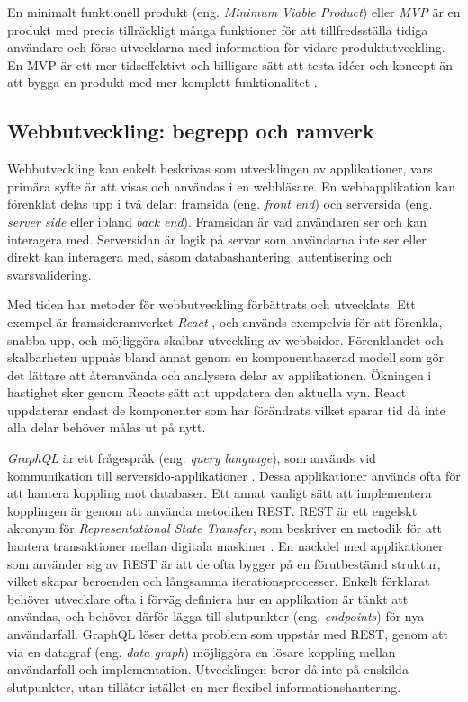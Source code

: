 En minimalt funktionell produkt (eng. \emph{Minimum Viable Product}) eller \emph{MVP} är en produkt med precis tillräckligt många funktioner för att tillfredsställa tidiga användare och förse utvecklarna med information för vidare produktutveckling. En MVP är ett mer tidseffektivt och billigare sätt att testa idéer och koncept än att bygga en produkt med mer komplett funktionalitet \cite{ries}. 

\subsection{Webbutveckling: begrepp och ramverk}
Webbutveckling kan enkelt beskrivas som utvecklingen av applikationer, vars primära syfte är att visas och användas i en webbläsare. En webbapplikation kan förenklat delas upp i två delar: framsida (eng. \emph{front end}) och serversida (eng. \emph{server side} eller ibland \emph{back end}). Framsidan är vad användaren ser och kan interagera med. Serversidan är logik på servar som användarna inte ser eller direkt kan interagera med, såsom databashantering, autentisering och svarsvalidering.

Med tiden har metoder för webbutveckling förbättrats och utvecklats. Ett exempel är framsideramverket \emph{React} \cite{react}, och används exempelvis för att förenkla, snabba upp, och möjliggöra skalbar utveckling av webbsidor. Förenklandet och skalbarheten uppnås bland annat genom en komponentbaserad modell som gör det lättare att återanvända och analysera delar av applikationen. Ökningen i hastighet sker genom Reacts sätt att uppdatera den aktuella vyn. React uppdaterar endast de komponenter som har förändrats vilket sparar tid då inte alla delar behöver målas ut på nytt.

\emph{GraphQL} är ett frågespråk (eng. \emph{query language}), som används vid kommunikation till serversido-applikationer \cite{graphql}. Dessa applikationer används ofta för att hantera koppling mot databaser. Ett annat vanligt sätt att implementera kopplingen är genom att använda metodiken REST. REST är ett engelskt akronym för \emph{Representational State Transfer}, som beskriver en metodik för att hantera transaktioner mellan digitala maskiner \cite{rest}. En nackdel med applikationer som använder sig av REST är att de ofta bygger på en förutbestämd struktur, vilket skapar beroenden och långsamma iterationsprocesser. Enkelt förklarat behöver utvecklare ofta i förväg definiera hur en applikation är tänkt att användas, och behöver därför lägga till slutpunkter (eng. \emph{endpoints}) för nya användarfall. GraphQL löser detta problem som uppstår med REST, genom att via en datagraf (eng. \emph{data graph}) möjliggöra en lösare koppling mellan användarfall och implementation. Utvecklingen beror då inte på enskilda slutpunkter, utan tillåter istället en mer flexibel informationshantering.


